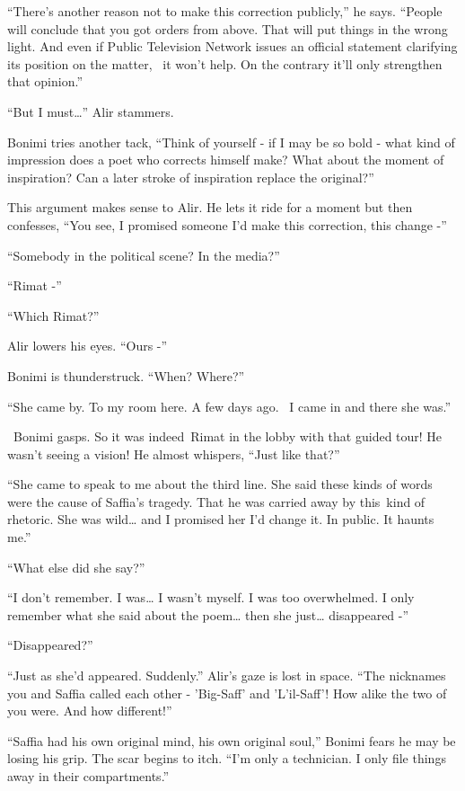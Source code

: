 \documentclass[twoside,11pt]{book}
\begin{document}
``There's another reason not to make this correction publicly,'' he says. ``People will conclude that you
got orders from above. That will put things in the wrong light. And even if Public Television Network issues an
official statement clarifying its position on the matter, \ it won't help. On the contrary it'll only strengthen that
opinion.''

``But I must{\dots}'' Alir stammers.

Bonimi tries another tack, ``Think of yourself - if I may be so bold - what kind of impression does a poet
who corrects himself make? What about the moment of inspiration? Can a later stroke of inspiration replace the
original?''

This argument makes sense to Alir. He lets it ride for a moment but then confesses, ``You see, I promised
someone I'd make this correction, this change -''

``Somebody in the political scene? In the media?''

``Rimat -''

``Which Rimat?''

Alir lowers his eyes. ``Ours -''

Bonimi is thunderstruck. ``When? Where?''

``She came by. To my room here. A few days ago. ~I came in and there she was.''

~Bonimi gasps. So it was indeed~Rimat in the lobby with that guided tour! He wasn't seeing a vision! He almost whispers,
``Just like that?''

``She came to speak to me about the third line. She said these kinds of words were the cause of Saffia's
tragedy. That he was carried away by this~kind of{ }rhetoric. She was wild{\dots} and I promised her I'd
change it. In public. It haunts me.''

``What else did she say?''

``I don't remember. I was{\dots} I wasn't myself. I was too overwhelmed. I only remember what she said
about the poem{\dots} then she just{\dots} disappeared -''

``Disappeared?''

``Just as she'd appeared. Suddenly.'' Alir's gaze is lost in space. ``The
nicknames you and Saffia called each other - 'Big-Saff' and 'L'il-Saff'! How alike the two of you were. And how
different!''

``Saffia had his own original mind, his own original soul,'' Bonimi fears he may be losing his
grip. The scar begins to itch. ``I'm only a technician. I only file things away in their
compartments.''
\end{document}

